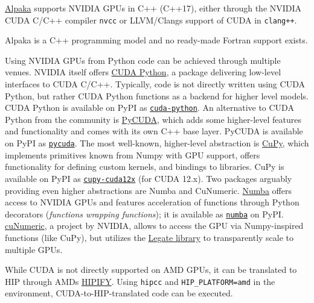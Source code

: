  \href{https://github.com/alpaka-group/alpaka}{Alpaka} supports NVIDIA GPUs in C++ (C++17), either through the NVIDIA CUDA C/C++ compiler \texttt{nvcc} or LLVM/Clang\textquotesingle s support of CUDA in \texttt{clang++}.   

 Alpaka is a C++ programming model and no ready-made Fortran support exists.   

 Using NVIDIA GPUs from Python code can be achieved through multiple venues. NVIDIA itself offers \href{https://github.com/NVIDIA/cuda-python}{CUDA Python}, a package delivering low-level interfaces to CUDA C/C++. Typically, code is not directly written using CUDA Python, but rather CUDA Python functions as a backend for higher level models. CUDA Python is available on PyPI as \href{https://pypi.org/project/cuda-python/}{\texttt{cuda-python}}. An alternative to CUDA Python from the community is \href{https://github.com/inducer/pycuda}{PyCUDA}, which adds some higher-level features and functionality and comes with its own C++ base layer. PyCUDA is available on PyPI as \href{https://pypi.org/project/pycuda/}{\texttt{pycuda}}. The most well-known, higher-level abstraction is \href{https://cupy.dev/}{CuPy}, which implements primitives known from Numpy with GPU support, offers functionality for defining custom kernels, and bindings to libraries. CuPy is available on PyPI as \href{https://pypi.org/project/cupy-cuda12x/}{\texttt{cupy-cuda12x}} (for CUDA 12.x). Two packages arguably providing even higher abstractions are Numba and CuNumeric. \href{http://numba.pydata.org/}{Numba} offers access to NVIDIA GPUs and features acceleration of functions through Python decorators (\emph{functions wrapping functions}); it is available as \href{https://pypi.org/project/numba/}{\texttt{numba}} on PyPI. \href{https://github.com/nv-legate/cunumeric}{cuNumeric}, a project by NVIDIA, allows to access the GPU via Numpy-inspired functions (like CuPy), but utilizes the \href{https://github.com/nv-legate/legate.core}{Legate library} to transparently scale to multiple GPUs.   

 While CUDA is not directly supported on AMD GPUs, it can be translated to HIP through AMD\textquotesingle s \href{https://github.com/ROCm-Developer-Tools/HIPIFY}{HIPIFY}. Using \texttt{hipcc} and \texttt{HIP\_PLATFORM=amd} in the environment, CUDA-to-HIP-translated code can be executed.   

